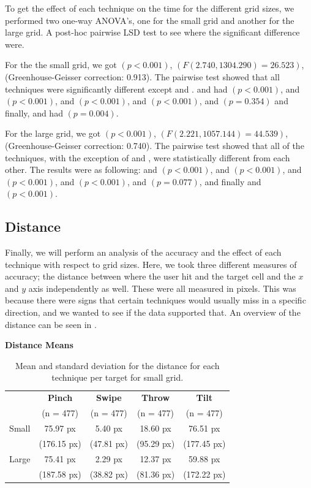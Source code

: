 To get the effect of each technique on the time for the different grid sizes, we performed two one-way ANOVA's, one for the small grid and another for the large grid.
A post-hoc pairwise LSD test to see where the significant difference were.

For the the small grid, we got $(p<0.001)$, $(F(2.740, 1304.290)=26.523)$, (Greenhouse-Geisser correction: 0.913).
The pairwise test showed that all techniques were significantly different except \swipe and \tilt. 
\pinch and \swipe had $(p < 0.001)$, 
\pinch and \throw $(p <0.001)$, 
\pinch and \tilt $(p < 0.001)$, 
\swipe and \throw $(p < 0.001)$, 
\swipe and \tilt $(p = 0.354)$ and finally, 
\throw and \tilt had $(p = 0.004)$. 

For the large grid, we got $(p<0.001)$, $(F(2.221, 1057.144)=44.539)$, (Greenhouse-Geisser correction: 0.740).
The pairwise test showed that all of the techniques, with the exception of \swipe and \tilt, were statistically different from each other. The results were as following: 
\pinch and \swipe $(p<0.001)$, 
\pinch and \throw $(p<0.001)$, 
\pinch and \tilt $(p<0.001)$, 
\swipe and \throw $(p<0.001)$, 
\swipe and \tilt $(p=0.077)$, and finally 
\throw and \tilt $(p<0.001)$.

\subsection{Distance}
Finally, we will perform an analysis of the accuracy and the effect of each technique with respect to grid sizes.
Here, we took three different measures of accuracy; the distance between where the user hit and the target cell and the $x$ and $y$ axis independently as well. 
These were all measured in pixels.
This was because there were signs that certain techniques would usually miss in a specific direction, and we wanted to see if the data supported that. 
An overview of the distance can be seen in .

\begin{table}[H]
	\centering
	\textbf{Distance Means}\\[4pt]
	\begin{adjustbox}{width=\columnwidth}
	\begin{tabular}{|c|c|c|c|c|}
		\hline
		\rowcolor[HTML]{9B9B9B} 
		& \textbf{Pinch} & \textbf{Swipe} & \textbf{Throw} & \textbf{Tilt} \\
		\rowcolor[HTML]{9B9B9B} 
		& (n = 477) & (n = 477) & (n = 477) & (n = 477) \\ \hline
		Small & 75.97 px & 5.40 px & 18.60 px  & 76.51 px         \\
		& (176.15 px) & (47.81 px) & (95.29 px) & (177.45 px) \\ \hline
		Large & 75.41 px & 2.29 px & 12.37 px & 59.88 px         \\
		& (187.58 px) & (38.82 px) & (81.36 px) & (172.22 px) \\ \hline
	\end{tabular}
	\end{adjustbox}
	\caption{Mean and standard deviation for the distance for each technique per target for small grid.}
	\label{tab:distance}
\end{table}

